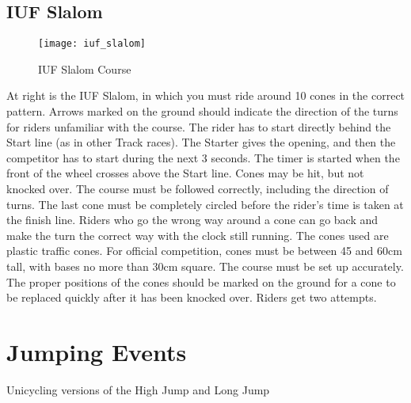 \subsection{IUF Slalom}
\begin{wrapfigure}{R}{0.42\textwidth}
\vspace{-30pt}
\begin{center}
\texttt{[image: iuf\_slalom]}
\end{center}
\vspace{-28pt}
\caption{IUF Slalom Course \label{fig:iuf_slalom}}
\vspace{-10pt}
\end{wrapfigure}
At right is the IUF Slalom, in which you must ride around 10 cones in the correct pattern.
Arrows marked on the ground should indicate the direction of the turns for riders unfamiliar with the course.
The rider has to start directly behind the Start line (as in other Track races).
The Starter gives the opening, and then the competitor has to start during the next 3 seconds.
The timer is started when the front of the wheel crosses above the Start line.
Cones may be hit, but not knocked over.
The course must be followed correctly, including the direction of turns.
The last cone must be completely circled before the rider’s time is taken at the finish line.
Riders who go the wrong way around a cone can go back and make the turn the correct way with the clock still running.
The cones used are plastic traffic cones.
For official competition, cones must be between 45 and 60cm tall, with bases no more than 30cm square.
The course must be set up accurately.
The proper positions of the cones should be marked on the ground for a cone to be replaced quickly after it has been knocked over.
Riders get two attempts.

\section{Jumping Events \label{sec:racing_jumping-events}}
Unicycling versions of the High Jump and Long Jump 
